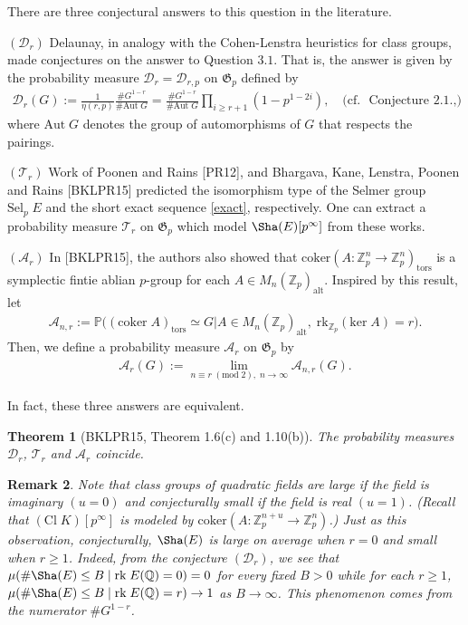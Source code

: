 \documentclass[12pt,reqno]{amsart}
\newtheorem{thm}{Theorem}[section]
\newtheorem{remark}[thm]{Remark}
\numberwithin{equation}{section}
\def\Z{{\mathbb Z}}
\def\Q{{\mathbb Q}}
\def\P{{\mathbb P}}
\def\sG{{\mathfrak G}}
\begin{document}
There are three conjectural answers to this question in the literature.

\smallskip

$(\mathscr{D}_r)$ Delaunay, in analogy with the Cohen-Lenstra heuristics for class groups, made conjectures on the answer to Question $3.1$. That is, the answer is given by the probability measure $\mathscr{D}_r = \mathscr{D}_{r,p}$ on $\sG_p$ defined by
\begin{align*}
\mathscr{D}_r(G):= \frac{1}{\eta(r,p)}\frac{\# G^{1-r}}{\# \text{Aut}\; G} = \frac{\# G^{1-r}}{\# \text{Aut}\; G}  \prod_{i \ge r+1} (1-p^{1-2i}), \quad \text{(cf.~ Conjecture $2.1$.,)}
\end{align*}
where $\text{Aut} \; G$ denotes the group of automorphisms of $G$ that respects the pairings.

\smallskip

$(\mathscr{T}_r)$ Work of Poonen and Rains [PR12], and Bhargava, Kane, Lenstra, Poonen and Rains [BKLPR15] predicted the isomorphism type of the Selmer group $\text{Sel}_p \; E$ and the short exact sequence \eqref{exact}, respectively. One can extract a probability measure $\mathscr{T}_r$ on $\sG_p$ which model $\Sha(E)[p^\infty]$ from these works.

\smallskip

$(\mathscr{A}_r)$ In [BKLPR15], the authors also showed that $\text{coker}(A: \Z_p^n \to \Z_p^n)_{\text{tors}}$ is a symplectic fintie ablian $p$-group for each $A \in M_n(\Z_p)_{\text{alt}}$. Inspired by this result, let 
\begin{align*}
\mathscr{A}_{n,r}:= \P\big( (\text{coker} \; A)_{\text{tors}} \simeq G | A \in M_n(\Z_p)_{\text{alt}}, \; \text{rk}_{\Z_p}(\text{ker} \; A) = r \big).
\end{align*}
Then, we define a probability measure $\mathscr{A}_r$ on $\sG_p$ by
\begin{align*}
\mathscr{A}_r(G):= \lim_{n \equiv r \; (\text{mod} \; 2), \; n \to \infty} \mathscr{A}_{n,r}(G).
\end{align*}

\smallskip

In fact, these three answers are equivalent.

\begin{thm}[BKLPR15, Theorem 1.6(c) and 1.10(b)]
The probability measures $\mathscr{D}_r$, $\mathscr{T}_r$ and $\mathscr{A}_r$ coincide.
\end{thm}

\begin{remark}
{\rm
Note that class groups of quadratic fields are large if the field is imaginary $(u=0)$ and conjecturally small if the field is real $(u=1)$. (Recall that $(\text{Cl} \; K)[p^\infty]$ is modeled by $\text{coker}(A : \Z_p^{n+u} \to \Z_p^n)$.) Just as this observation, conjecturally, $\Sha(E)$ is large on average when $r = 0$ and small when $r \ge 1$.
Indeed, from the conjecture $(\mathscr{D}_r)$, we see that $\mu(\# \Sha(E) \le B \; | \; \text{rk} \; E(\Q) = 0) = 0$ for every fixed $B>0$ while for each $r \ge 1$, $\mu(\# \Sha(E) \le B \; | \; \text{rk} \; E(\Q) = r) \to 1$ as $B \to \infty$. This phenomenon comes from the numerator $\# G^{1-r}$.
}
\end{remark}
\end{document}
